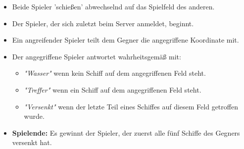 \begin{itemize}
		\begin{itemize}
			\item Beide Spieler 'schießen' abwechselnd auf das Spielfeld des anderen.
			\item Der Spieler, der sich zuletzt beim Server anmeldet, beginnt.
			\item Ein angreifender Spieler teilt dem Gegner die angegriffene Koordinate mit.
			\item Der angegriffene Spieler antwortet wahrheitsgemäß mit:
				\begin{itemize}
					\item \emph{"Wasser"} wenn kein Schiff auf dem angegriffenen Feld steht.
					\item \emph{"Treffer"} wenn ein Schiff auf dem angegriffenen Feld steht.
					\item \emph{"Versenkt"} wenn der letzte Teil eines Schiffes auf diesem Feld getroffen wurde.
				\end{itemize}
			\item \textbf{Spielende:} Es gewinnt der Spieler, der zuerst alle fünf Schiffe des Gegners versenkt hat.
		\end{itemize}
\end{itemize}